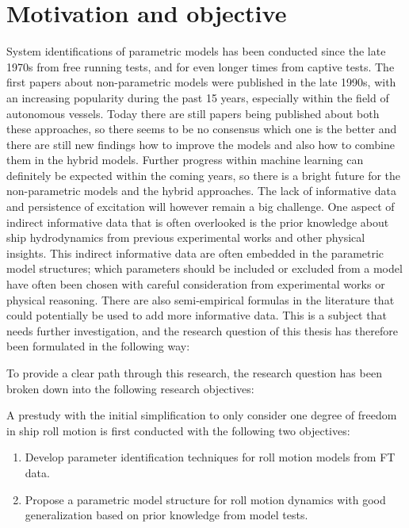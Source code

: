 \section{Motivation and objective}
\label{sec:motivation}
System identifications of parametric models has been conducted since the late 1970s from free running tests, and for even longer times from captive tests. The first papers about non-parametric models were published in the late 1990s, with an increasing popularity during the past 15 years, especially within the field of autonomous vessels. Today there are still papers being published about both these approaches, so there seems to be no consensus which one is the better and there are still new findings how to improve the models and also how to combine them in the hybrid models.
Further progress within machine learning can definitely be expected within the coming years, so there is a bright future for the non-parametric models and the hybrid approaches. The lack of informative data and persistence of excitation will however remain a big challenge. One aspect of indirect informative data that is often overlooked is the prior knowledge about ship hydrodynamics from previous experimental works and other physical insights. This indirect informative data are often embedded in the parametric model structures; which parameters should be included or excluded from a model have often been chosen with careful consideration from experimental works or physical reasoning. There are also semi-empirical formulas in the literature that could potentially be used to add more informative data. This is a subject that needs further investigation, and the research question of this thesis has therefore been formulated in the following way: 
\begin{tcolorbox}[sharp corners,title=Research question]
    \emph{\researchquestion}
\end{tcolorbox}
To provide a clear path through this research, the research question has been broken down into the following research objectives:

\noindent A prestudy with the initial simplification to only consider one degree of freedom in ship roll motion is first conducted with the following two objectives:
\begin{enumerate}[label=(\Alph*),itemsep=1mm]

    \item Develop parameter identification techniques for roll motion models from FT data.
    
    \item Propose a parametric model structure for roll motion dynamics with good generalization based on prior knowledge from model tests. 

\end{enumerate}


